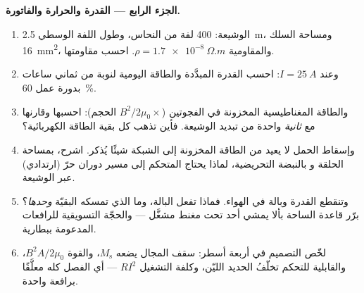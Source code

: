 \begin{problem}
\medskip\noindent\textbf{الجزء الرابع --- القدرة والحرارة والفاتورة.}

\begin{enumerate}[resume]
  \item الوشيعة: 400 لفة من النحاس، وطول اللفة الوسطي
        \qty{2.5}{m}، ومساحة السلك \qty{16}{mm^2}، والمقاومية
        $\rho = \qty{1.7e-8}{\Omega.m}$. احسب مقاومتها.
  \item وعند $I = \qty{25}{A}$: احسب القدرة المبدَّدة والطاقة
        اليومية لنوبة من ثماني ساعات بدورة عمل \qty{60}{\percent}.
  \item والطاقة المغناطيسية المخزونة في الفجوتين
        ($B^2/2\mu_0 \times$ الحجم): احسبها وقارنها مع
        \emph{ثانية} واحدة من تبديد الوشيعة. فأين تذهب كل
        بقية الطاقة الكهربائية؟
  \item وإسقاط الحمل لا يعيد من الطاقة المخزونة إلى
        الشبكة شيئًا يُذكر. اشرح، بمساحة الحلقة و
        بالنبضة التحريضية، لماذا يحتاج المتحكم إلى مسير
        دوران حرّ (ارتدادي) عبر الوشيعة.
  \item وتنقطع القدرة وبالة في الهواء. فماذا تفعل البالة،
        وما الذي تمسكه البقيّة \emph{وحدها}؟ برّر
        قاعدة الساحة بألا يمشي أحد تحت مغنط مشغَّل ---
        والحجّة التسويقية للرافعات المدعومة ببطارية.
  \item لخّص التصميم في أربعة أسطر: سقف المجال يضعه
        $M_{\text{s}}$، والقوة $B^2A/2\mu_0$، والقابلية للتحكم
        تخلّفُ الحديد الليّن، وكلفة التشغيل $RI^2$ --- أي
        الفصل كله معلَّقًا برافعة واحدة.
\end{enumerate}
\end{problem}
